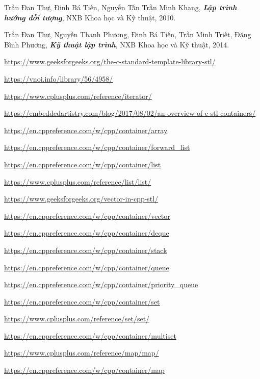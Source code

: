 \newpage
\begin{thebibliography}{99}
Trần Đan Thư, Đinh Bá Tiến, Nguyễn Tấn Trần Minh Khang, \textit{\textbf{Lập trình hướng đối tượng}}, NXB Khoa học và Kỹ thuật, 2010.

Trần Đan Thư, Nguyễn Thanh Phương, Đinh Bá Tiến, Trần Minh Triết, Đặng Bình Phương, \textit{\textbf{Kỹ thuật lập trình}}, NXB Khoa học và Kỹ thuật, 2014.

\url{https://www.geeksforgeeks.org/the-c-standard-template-library-stl/}

\url{https://vnoi.info/library/56/4958/}

\url{https://www.cplusplus.com/reference/iterator/}

\url{https://embeddedartistry.com/blog/2017/08/02/an-overview-of-c-stl-containers/}

\url{https://en.cppreference.com/w/cpp/container/array}

\url{https://en.cppreference.com/w/cpp/container/forward_list}

\url{https://en.cppreference.com/w/cpp/container/list}

\url{https://www.cplusplus.com/reference/list/list/}

\url{https://www.geeksforgeeks.org/vector-in-cpp-stl/}

\url{https://en.cppreference.com/w/cpp/container/vector}

\url{https://en.cppreference.com/w/cpp/container/deque}

\url{https://en.cppreference.com/w/cpp/container/stack}

\url{https://en.cppreference.com/w/cpp/container/queue}

\url{https://en.cppreference.com/w/cpp/container/priority_queue}

\url{https://en.cppreference.com/w/cpp/container/set}

\url{https://www.cplusplus.com/reference/set/set/}

\url{https://en.cppreference.com/w/cpp/container/multiset}

\url{https://www.cplusplus.com/reference/map/map/}

\url{https://en.cppreference.com/w/cpp/container/map}


\end{thebibliography}
